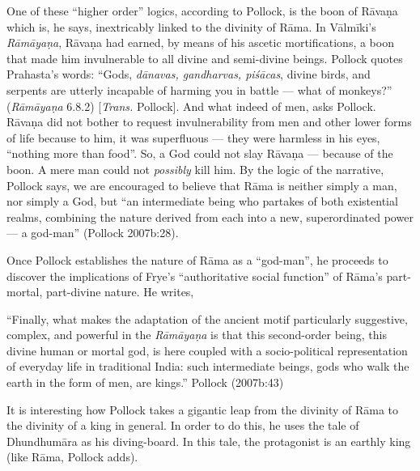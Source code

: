 One of these “higher order” logics, according to Pollock, is the boon of Rāvaṇa which is, he says, inextricably linked to the divinity of Rāma. In Vālmīki’s {\sl Rāmāyaṇa}, Rāvaṇa had earned, by means of his ascetic mortifications, a boon that made him invulnerable to all divine and semi-divine beings.  Pollock quotes Prahasta’s words: “Gods, {\sl dānavas, gandharvas, piśācas}, divine birds, and serpents are utterly incapable of harming you in battle --- what of monkeys?” ({\sl Rāmāyaṇa} 6.8.2) [{\sl Trans.} Pollock]. And what indeed of men, asks Pollock. Rāvaṇa did not bother to request invulnerability from men and other lower forms of life because to him, it was superfluous --- they were harmless in his eyes, “nothing more than food”. So, a God could not slay Rāvaṇa --- because of the boon. A mere man could not {\sl possibly} kill him. By the logic of the narrative, Pollock says, we are encouraged to believe that Rāma is neither simply a man, nor simply a God, but “an intermediate being who partakes of both existential realms, combining the nature derived from each into a new, superordinated power --- a god-man” (Pollock 2007b:28).  

Once Pollock establishes the nature of Rāma as a “god-man”, he proceeds to discover the implications of Frye’s “authoritative social function” of Rāma’s part-mortal, part-divine nature. He writes, 

\begin{myquote}
“Finally, what makes the adaptation of the ancient motif particularly suggestive, complex, and powerful in the {\sl Rāmāyaṇa} is that this second-order being, this divine human or mortal god, is here coupled with a socio-political representation of everyday life in traditional India: such intermediate beings, gods who walk the earth in the form of men, are kings.”
\hfill  Pollock (2007b:43)
\end{myquote}

It is interesting how Pollock takes a gigantic leap from the divinity of Rāma to the divinity of a king in general. In order to do this, he uses the tale of Dhundhumāra as his diving-board. In this tale, the protagonist is an earthly king (like Rāma, Pollock adds). 

